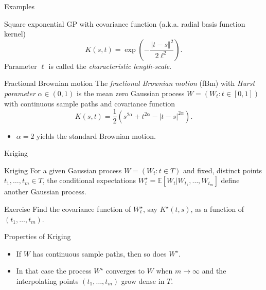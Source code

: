 \begin{frame}{Examples}

	
\begin{exampleblock}{Square exponential}
	GP with covariance function (a.k.a. radial basis function kernel)
	$$K(s,t) = \exp\left(-\frac{\Vert t-s\Vert^2}{2\ell^2}\right).$$
	Parameter $\ell$ is called the \textit{characteristic length-scale}.
\end{exampleblock}


\begin{exampleblock}{Fractional Brownian motion}
	The \textit{fractional Brownian motion} (fBm) with \textit{Hurst parameter} $\alpha\in  (0, 1)$ is the mean zero Gaussian process $ W = (W_t : t \in  [0, 1])$ with continuous sample paths and covariance function
	$$K(s,t) = \frac{1}{2}\left(s^{2\alpha}+t^{2\alpha}-|t-s|^{2\alpha}\right).$$
	\begin{itemize}
		\item $\alpha=2$ yields the standard Brownian motion.
	\end{itemize}
\end{exampleblock}
	
\end{frame}



\begin{frame}{Kriging}

\begin{exampleblock}{Kriging}
	For a given Gaussian process $W = (W_t : t \in T)$ and fixed, distinct points $t_1,\ldots,t_m \in T$, the conditional expectations $W_t^\star  = \mathbb{E}[ W_t|W_{t_1},\ldots,W_{t_m}]$ define another Gaussian process.
\end{exampleblock}

\pause 

\begin{block}{Exercise}
	Find the covariance function of $W_t^\star$, say $K^\star(t,s)$, as a function of $(t_1,\ldots,t_m)$.
\end{block}

\pause 

\begin{alertblock}{Properties of Kriging}
	\begin{itemize}
		\item If $W$ has continuous sample paths, then so does $W^\star$. 
		\item In that case the process $W^\star$ converges to $W$ when $m \to \infty$  and the interpolating points $(t_1,\ldots,t_m)$ grow dense in $T$.
	\end{itemize}
\end{alertblock}
\end{frame}

